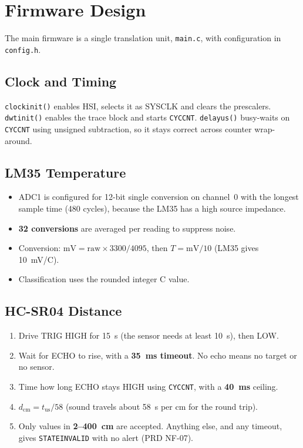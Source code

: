 \documentclass[11pt,a4paper]{article}
\newcommand{\degC}{\textdegree{}C}
\newcommand{\us}{\textmu s}
\newcommand{\ttu}{\textunderscore}
\begin{document}
\section{Firmware Design}
The main firmware is a single translation unit, \texttt{main.c}, with configuration in \texttt{config.h}.

\subsection{Clock and Timing}
\texttt{clock\ttu init()} enables HSI, selects it as SYSCLK and clears the prescalers. \texttt{dwt\ttu init()} enables the trace block and starts \texttt{CYCCNT}. \texttt{delay\ttu us()} busy-waits on \texttt{CYCCNT} using unsigned subtraction, so it stays correct across counter wrap-around.

\subsection{LM35 Temperature}
\begin{itemize}
  \item ADC1 is configured for 12-bit single conversion on channel~0 with the longest sample time (480 cycles), because the LM35 has a high source impedance.
  \item \textbf{32 conversions} are averaged per reading to suppress noise.
  \item Conversion: $\mathrm{mV} = \mathrm{raw}\times 3300/4095$, then $T = \mathrm{mV}/10$ (LM35 gives 10~mV/\degC).
  \item Classification uses the rounded integer \degC{} value.
\end{itemize}

\subsection{HC-SR04 Distance}
\begin{enumerate}
  \item Drive TRIG HIGH for 15~\us{} (the sensor needs at least 10~\us), then LOW.
  \item Wait for ECHO to rise, with a \textbf{35~ms timeout}. No echo means no target or no sensor.
  \item Time how long ECHO stays HIGH using \texttt{CYCCNT}, with a \textbf{40~ms} ceiling.
  \item $d_{\mathrm{cm}} = t_{\mathrm{us}}/58$ (sound travels about 58~\us{} per cm for the round trip).
  \item Only values in \textbf{2--400~cm} are accepted. Anything else, and any timeout, gives \texttt{STATE\ttu INVALID} with no alert (PRD NF-07).
\end{enumerate}
\end{document}
